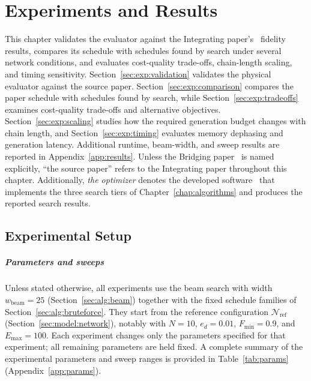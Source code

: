 \chapter{Experiments and Results}
\label{chap:experiments}


This chapter validates the evaluator against the Integrating paper's~\cite{Benchasattabuse2025Integrating} fidelity results, compares its schedule with schedules found by search under several network conditions, and evaluates cost-quality trade-offs, chain-length scaling, and timing sensitivity. Section~\ref{sec:exp:validation} validates the physical evaluator against the source paper. Section~\ref{sec:exp:comparison} compares the paper schedule with schedules found by search, while Section~\ref{sec:exp:tradeoffs} examines cost-quality trade-offs and alternative objectives. Section~\ref{sec:exp:scaling} studies how the required generation budget changes with chain length, and Section~\ref{sec:exp:timing} evaluates memory dephasing and generation latency. Additional runtime, beam-width, and sweep results are reported in Appendix~\ref{app:results}. Unless the Bridging paper~\cite{Benchasattabuse2026Bridging} is named explicitly, ``the source paper'' refers to the Integrating paper throughout this chapter. Additionally, \emph{the optimizer} denotes the developed software~\cite{Flechtner2026Entanglement} that implements the three search tiers of Chapter~\ref{chap:algorithms} and produces the reported search results.

\section{Experimental Setup}
\label{sec:exp:setup}

\paragraph{Parameters and sweeps}
\label{sec:exp:params}

Unless stated otherwise, all experiments use the beam search with width $w_{\mathrm{beam}}=25$ (Section~\ref{sec:alg:beam}) together with the fixed schedule families of Section~\ref{sec:alg:bruteforce}. They start from the reference configuration $\mathcal{N}_{\mathrm{ref}}$ (Section~\ref{sec:model:network}), notably with $N=10$, $e_d=0.01$, $F_{\min}=0.9$, and $E_{\max}=100$. Each experiment changes only the parameters specified for that experiment; all remaining parameters are held fixed. A complete summary of the experimental parameters and sweep ranges is provided in Table~\ref{tab:params} (Appendix~\ref{app:params}).

